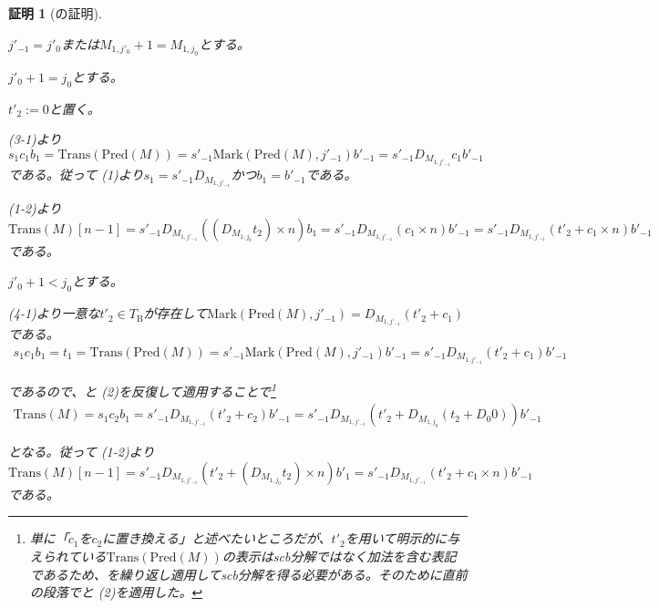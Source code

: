 \documentclass[dvipdfmx,uplatex]{jsarticle}
\theoremstyle{customnonumberbreakfortheorem}
\theoremstyle{customnonumberbreakforproof}
\newtheorem{hideableproof}{証明}
\begin{document}
\begin{hideableproof}[の証明]
\begin{indented}
\begin{indented}
			\item \(j'_{-1} = j'_0\)または\(M_{1,j'_0}+1 = M_{1,j_0}\)とする。
			\begin{indented}
				\item \(j'_0+1 = j_0\)とする。
				\begin{indented}
					\item \(t'_2 := 0\)と置く。
					\item {} (3-1)より\(s_1 c_1 b_1 = \textrm{Trans}(\textrm{Pred}(M)) = s'_{-1} \textrm{Mark}(\textrm{Pred}(M),j'_{-1}) b'_{-1} = s'_{-1} D_{M_{1,j'_{-1}}} c_1 b'_{-1}\)である。従って (1)より\(s_1 = s'_{-1} D_{M_{1,j'_{-1}}}\)かつ\(b_1 = b'_{-1}\)である。
					\item {} (1-2)より\(\textrm{Trans}(M)[n-1] = s'_{-1} D_{M_{1,j'_{-1}}}((D_{M_{1,j_0}} t_2) \times n) b_1 = s'_{-1} D_{M_{1,j'_{-1}}}(c_1 \times n) b'_{-1} = s'_{-1} D_{M_{1,j'_{-1}}}(t'_2 + c_1 \times n) b'_{-1}\)である。
				\end{indented}
				\item \(j'_0+1 < j_0\)とする。
				\begin{indented}
					\item {} (4-1)より一意な\(t'_2 \in T_{\textrm{B}}\)が存在して\(\textrm{Mark}(\textrm{Pred}(M),j'_{-1}) = D_{M_{1,j'_{-1}}}(t'_2+c_1)\)である。
					\begin{eqnarray*}
					s_1 c_1 b_1 = t_1 = \textrm{Trans}(\textrm{Pred}(M)) = s'_{-1} \textrm{Mark}(\textrm{Pred}(M),j'_{-1}) b'_{-1} = s'_{-1} D_{M_{1,j'_{-1}}}(t'_2+c_1) b'_{-1}
					\end{eqnarray*}
					\item であるので、と (2)を反復して適用することで\footnote{単に「\(c_1\)を\(c_2\)に置き換える」と述べたいところだが、\(t'_2\)を用いて明示的に与えられている\(\textrm{Trans}(\textrm{Pred}(M))\)の表示はscb分解ではなく加法を含む表記であるため、を繰り返し適用してscb分解を得る必要がある。そのために直前の段落でと\nameref{scb分解の合成則} (2)を適用した。}
					\begin{eqnarray*}
					\textrm{Trans}(M) = s_1 c_2 b_1 = s'_{-1} D_{M_{1,j'_{-1}}}(t'_2+c_2) b'_{-1} = s'_{-1} D_{M_{1,j'_{-1}}}(t'_2 + D_{M_{1,j_0}}(t_2 + D_0 0)) b'_{-1}
					\end{eqnarray*}
					\item となる。従って (1-2)より\(\textrm{Trans}(M)[n-1] = s'_{-1} D_{M_{1,j'_{-1}}}(t'_2 + (D_{M_{1,j_0}} t_2) \times n) b'_1 = s'_{-1} D_{M_{1,j'_{-1}}}(t'_2 + c_1 \times n) b'_{-1}\)である。

\end{indented}
\end{indented}
\end{indented}
\end{indented}
\end{hideableproof}
\end{document}
